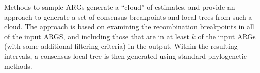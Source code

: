 \documentclass{article}
\begin{document}
Methods to sample ARGs generate a ``cloud'' of estimates, and
\cite{kuhner2017consensus} provide an approach to generate a
set of consensus breakpoints and local trees from
such a cloud.
The approach is based on examining the recombination breakpoints
in all of the input ARGS, and including those that are
in at least $k$ of the input ARGs (with some additional
filtering criteria) in the output.
Within the resulting intervals, a consensus
local tree is then generated using standard phylogenetic methods.


\end{document}
